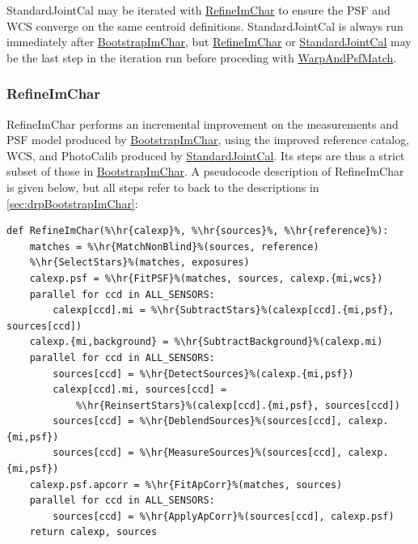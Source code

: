 StandardJointCal may be iterated with \hyperref[sec:drpRefineImChar]{RefineImChar} to ensure the PSF and WCS converge on the same centroid definitions.  StandardJointCal is always run immediately after \hyperref[sec:drpBootstrapImChar]{BootstrapImChar}, but \hyperref[sec:drpRefineImChar]{RefineImChar} or \hyperref[sec:drpStandardJointCal]{StandardJointCal} may be the last step in the iteration run before proceding with \hyperref[sec:drpWarpAndPsfMatch]{WarpAndPsfMatch}.

\subsubsection{RefineImChar}
\label{sec:drpRefineImChar}

RefineImChar performs an incremental improvement on the measurements and PSF model produced by \hyperref[sec:drpBootstrapImChar]{BootstrapImChar}, using the improved reference catalog, WCS, and PhotoCalib produced by \hyperref[sec:drpStandardJointCal]{StandardJointCal}.  Its steps are thus a strict subset of those in \hyperref[sec:drpBootstrapImChar]{BootstrapImChar}.  A pseudocode description of RefineImChar is given below, but all steps refer to back to the descriptions in \ref{sec:drpBootstrapImChar}:

\newcommand{\hr}[1]{\hyperref[sec:drpBootstrapImChar_#1]{#1}}

\begin{lstlisting}
def RefineImChar(%\hr{calexp}%, %\hr{sources}%, %\hr{reference}%):
    matches = %\hr{MatchNonBlind}%(sources, reference)
    %\hr{SelectStars}%(matches, exposures)
    calexp.psf = %\hr{FitPSF}%(matches, sources, calexp.{mi,wcs})
    parallel for ccd in ALL_SENSORS:
        calexp[ccd].mi = %\hr{SubtractStars}%(calexp[ccd].{mi,psf}, sources[ccd])
    calexp.{mi,background} = %\hr{SubtractBackground}%(calexp.mi)
    parallel for ccd in ALL_SENSORS:
        sources[ccd] = %\hr{DetectSources}%(calexp.{mi,psf})
        calexp[ccd].mi, sources[ccd] =
            %\hr{ReinsertStars}%(calexp[ccd].{mi,psf}, sources[ccd])
        sources[ccd] = %\hr{DeblendSources}%(sources[ccd], calexp.{mi,psf})
        sources[ccd] = %\hr{MeasureSources}%(sources[ccd], calexp.{mi,psf})
    calexp.psf.apcorr = %\hr{FitApCorr}%(matches, sources)
    parallel for ccd in ALL_SENSORS:
        sources[ccd] = %\hr{ApplyApCorr}%(sources[ccd], calexp.psf)
    return calexp, sources
\end{lstlisting}

